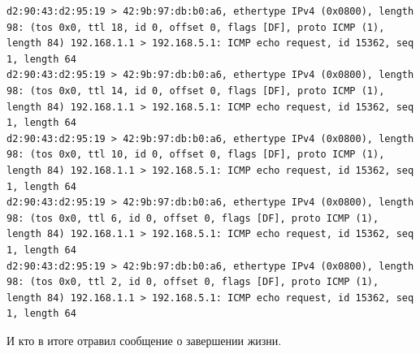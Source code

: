 \documentclass[a4paper,12pt]{article}
\begin{document}
\begin{Verbatim}
d2:90:43:d2:95:19 > 42:9b:97:db:b0:a6, ethertype IPv4 (0x0800), length 98: (tos 0x0, ttl 18, id 0, offset 0, flags [DF], proto ICMP (1), length 84) 192.168.1.1 > 192.168.5.1: ICMP echo request, id 15362, seq 1, length 64
d2:90:43:d2:95:19 > 42:9b:97:db:b0:a6, ethertype IPv4 (0x0800), length 98: (tos 0x0, ttl 14, id 0, offset 0, flags [DF], proto ICMP (1), length 84) 192.168.1.1 > 192.168.5.1: ICMP echo request, id 15362, seq 1, length 64
d2:90:43:d2:95:19 > 42:9b:97:db:b0:a6, ethertype IPv4 (0x0800), length 98: (tos 0x0, ttl 10, id 0, offset 0, flags [DF], proto ICMP (1), length 84) 192.168.1.1 > 192.168.5.1: ICMP echo request, id 15362, seq 1, length 64
d2:90:43:d2:95:19 > 42:9b:97:db:b0:a6, ethertype IPv4 (0x0800), length 98: (tos 0x0, ttl 6, id 0, offset 0, flags [DF], proto ICMP (1), length 84) 192.168.1.1 > 192.168.5.1: ICMP echo request, id 15362, seq 1, length 64
d2:90:43:d2:95:19 > 42:9b:97:db:b0:a6, ethertype IPv4 (0x0800), length 98: (tos 0x0, ttl 2, id 0, offset 0, flags [DF], proto ICMP (1), length 84) 192.168.1.1 > 192.168.5.1: ICMP echo request, id 15362, seq 1, length 64
\end{Verbatim}

И кто в итоге отравил сообщение о завершении жизни.
\end{document}
